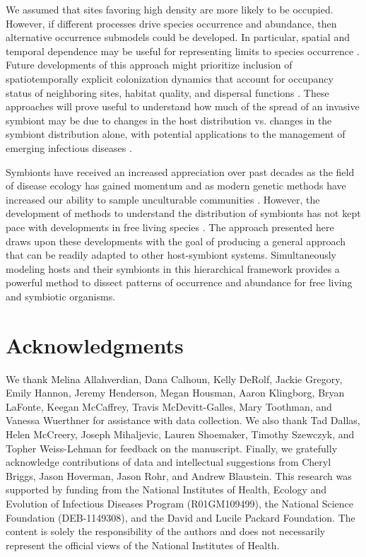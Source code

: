 We assumed that sites favoring high density are more likely to be occupied.
However, if different processes drive species occurrence and abundance, then alternative occurrence submodels could be developed.
In particular, spatial and temporal dependence may be useful for representing limits to species occurrence \citep{Holt2000}.
Future developments of this approach might prioritize inclusion of spatiotemporally explicit colonization dynamics that account for occupancy status of neighboring sites, habitat quality, and dispersal functions \citep{Broms2015}.
These approaches will prove useful to understand how much of the spread of an invasive symbiont may be due to changes in the host distribution vs. changes in the symbiont distribution alone, with potential applications to the management of emerging infectious diseases \citep{Mitchell2006}.

Symbionts have received an increased appreciation over past decades as the field of disease ecology has gained momentum and as modern genetic methods have increased our ability to sample unculturable communities \citep{Schrag1995, Riesenfeld2004}.
However, the development of methods to understand the distribution of symbionts has not kept pace with developments in free living species \citep{Bailey2014}.
The approach presented here draws upon these developments with the goal of producing a general approach that can be readily adapted to other host-symbiont systems.
Simultaneously modeling hosts and their symbionts in this hierarchical framework provides a powerful method to dissect patterns of occurrence and abundance for free living and symbiotic organisms.

\section{Acknowledgments}

We thank Melina Allahverdian, Dana Calhoun, Kelly DeRolf, Jackie Gregory, Emily Hannon, Jeremy Henderson, Megan Housman, Aaron Klingborg, Bryan LaFonte, Keegan McCaffrey, Travis McDevitt-Galles, Mary Toothman, and Vanessa Wuerthner for assistance with data collection.
We also thank Tad Dallas, Helen McCreery, Joseph Mihaljevic, Lauren Shoemaker, Timothy Szewczyk, and Topher Weiss-Lehman for feedback on the manuscript.
Finally, we gratefully acknowledge contributions of data and intellectual suggestions from Cheryl Briggs, Jason Hoverman, Jason Rohr, and Andrew Blaustein.
This research was supported by funding from the National Institutes of Health, Ecology and Evolution of Infectious Diseases Program (R01GM109499), the National Science Foundation (DEB-1149308), and the David and Lucile Packard Foundation.
The content is solely the responsibility of the authors and does not necessarily represent the official views of the National Institutes of Health.

